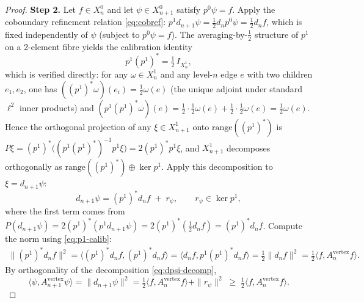 \documentclass[11pt]{article}
\theoremstyle{plain}
\theoremstyle{definition}
\theoremstyle{remark}
\begin{document}
\begin{proof}
\smallskip
\textbf{Step 2.} Let $f \in X_n^{0}$ and let $\psi \in X_{n+1}^{0}$
satisfy $p^{0} \psi = f$. Apply the coboundary refinement relation
\eqref{eq:cobref}:
$p^{1} d_{n+1} \psi = \tfrac12 d_n p^{0} \psi = \tfrac12 d_n f$,
which is fixed independently of $\psi$ (subject to
$p^{0} \psi = f$). The averaging-by-$\tfrac12$ structure of $p^{1}$
on a 2-element fibre yields the calibration identity
\begin{equation}\label{eq:p1-calib}
   p^{1} (p^{1})^{*} = \tfrac12 \, I_{X_n^{1}},
\end{equation}
which is verified directly: for any $\omega \in X_n^{1}$ and any
level-$n$ edge $e$ with two children $e_1, e_2$, one has
$((p^{1})^{*}\omega)(e_i) = \tfrac12 \omega(e)$ (the unique adjoint
under standard $\ell^{2}$ inner products) and
$(p^{1}(p^{1})^{*}\omega)(e) = \tfrac12 \cdot \tfrac12 \omega(e) +
\tfrac12 \cdot \tfrac12 \omega(e) = \tfrac12 \omega(e)$.
Hence the orthogonal projection of any
$\xi \in X_{n+1}^{1}$ onto $\mathrm{range}((p^{1})^{*})$ is
$P \xi = (p^{1})^{*}\bigl((p^{1}(p^{1})^{*})^{-1} p^{1} \xi\bigr) =
2(p^{1})^{*} p^{1} \xi$, and $X_{n+1}^{1}$ decomposes orthogonally
as $\mathrm{range}((p^{1})^{*}) \oplus \ker p^{1}$. Apply this
decomposition to $\xi = d_{n+1} \psi$:
\begin{equation}\label{eq:dpsi-decomp}
   d_{n+1} \psi = (p^{1})^{*} d_n f \;+\; r_{\psi},
   \qquad r_{\psi} \in \ker p^{1},
\end{equation}
where the first term comes from
$P (d_{n+1} \psi) = 2 (p^{1})^{*} (p^{1} d_{n+1} \psi) =
2 (p^{1})^{*} (\tfrac12 d_n f) = (p^{1})^{*} d_n f$. Compute the
norm using \eqref{eq:p1-calib}:
\begin{align*}
\|(p^{1})^{*} d_n f\|^{2}
   = \langle (p^{1})^{*} d_n f, (p^{1})^{*} d_n f\rangle
   = \langle d_n f, p^{1} (p^{1})^{*} d_n f\rangle
   = \tfrac12 \|d_n f\|^{2}
   = \tfrac12 \langle f, A_n^{\mathrm{vertex}} f\rangle.
\end{align*}
By orthogonality of the decomposition \eqref{eq:dpsi-decomp},
\begin{equation}\label{eq:psi-energy-lb}
\langle \psi, A_{n+1}^{\mathrm{vertex}} \psi\rangle
   = \|d_{n+1} \psi\|^{2}
   = \tfrac12 \langle f, A_n^{\mathrm{vertex}} f\rangle + \|r_{\psi}\|^{2}
   \;\ge\; \tfrac12 \langle f, A_n^{\mathrm{vertex}} f\rangle.
\end{equation}


\end{proof}
\end{document}
